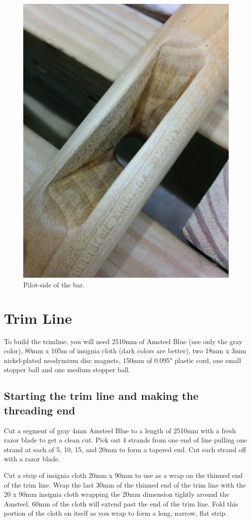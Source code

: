 \documentclass[
]{book}
\begin{document}
\begin{figure}

{\centering \includegraphics[width=0.5\linewidth]{images/pilot-side-borehole} 

}

\caption{Pilot-side of the bar.}\label{fig:pilot-side-borehole}
\end{figure}

\hypertarget{trim-line}{%
\section{Trim Line}\label{trim-line}}

To build the trimline, you will need 2510mm of Amsteel Blue (use only the gray color), 80mm x 105m of insignia cloth (dark colors are better), two 18mm x 3mm nickel-plated neodymium disc magnets, 150mm of 0.095" plastic cord, one small stopper ball and one medium stopper ball.

\hypertarget{starting-the-trim-line-and-making-the-threading-end}{%
\subsection{Starting the trim line and making the threading end}\label{starting-the-trim-line-and-making-the-threading-end}}

Cut a segment of gray 4mm Amsteel Blue to a length of 2510mm with a fresh razor blade to get a clean cut. Pick out 4 strands from one end of line pulling one strand at each of 5, 10, 15, and 20mm to form a tapered end. Cut each strand off with a razor blade.

Cut a strip of insignia cloth 20mm x 90mm to use as a wrap on the thinned end of the trim line. Wrap the last 30mm of the thinned end of the trim line with the 20 x 90mm insignia cloth wrapping the 20mm dimension tightly around the Amsteel. 60mm of the cloth will extend past the end of the trim line. Fold this portion of the cloth on itself as you wrap to form a long, narrow, flat strip.
\end{document}
